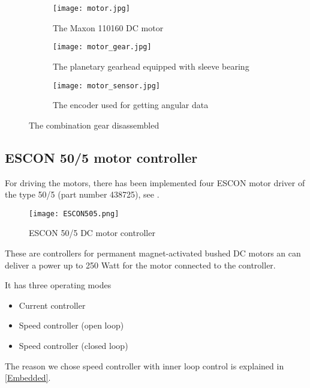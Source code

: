 \begin{figure}[H]
	\centering
	\begin{subfigure}{.32\textwidth}
		\vspace{0pt}
		\centering
		\texttt{[image: motor.jpg]}
		\caption{The Maxon 110160 \newline DC motor\cite{motor_motor}}
		\label{fig:motor}
	\end{subfigure}
	\begin{subfigure}{.32\textwidth}
		\centering
		\texttt{[image: motor\_gear.jpg]}
		\caption{The planetary gearhead equipped with sleeve bearing\cite{motor_gear}}
		\label{fig:motor_gear}
	\end{subfigure}
	\begin{subfigure}{.32\textwidth}
	\hspace{5pt}
		\centering
		\texttt{[image: motor\_sensor.jpg]}
		\caption{The encoder used for getting angular data\cite{motor_encoder}}
		\label{fig:motor_sensor}
	\end{subfigure}
	\caption{The combination gear disassembled}
	\label{fig:Full_motor _dis}
\end{figure}





\subsection{ESCON 50/5 motor controller}
For driving the motors, there has been implemented four ESCON motor driver of the type 50/5 (part number 438725), see . 

\begin{figure}[H]
	\centering
		\centering
		\texttt{[image: ESCON505.png]}
		\caption{ESCON 50/5 DC motor controller\cite{ESCON_motor_controller}}
		\label{fig:ESCON505}
\end{figure}

These are controllers for permanent magnet-activated bushed DC motors an can deliver a power up to 250 Watt for the motor connected to the controller. 

It has three operating modes

\begin{itemize}
\item Current controller
\item Speed controller (open loop)
\item Speed controller (closed loop)
\end{itemize}

The reason we chose speed controller with inner loop control is explained in \ref{Embedded}.





